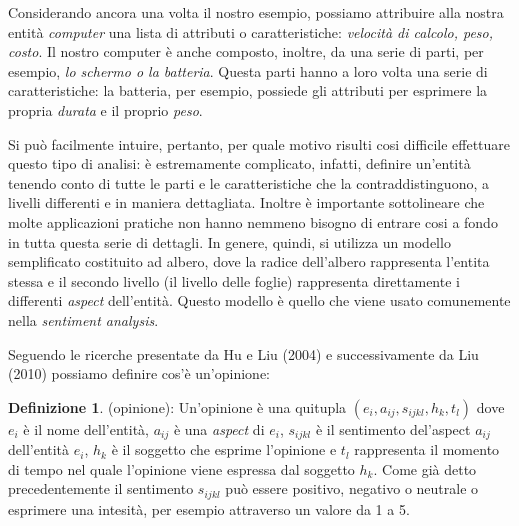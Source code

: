 \documentclass[a4paper,12pt,openright,twoside]{report}
\theoremstyle{definition}
\newtheorem{defi}{Definizione}[section]
\begin{document}
Considerando ancora una volta il nostro esempio, possiamo attribuire alla nostra entità \emph{computer}
una lista di attributi o caratteristiche: \emph{velocità di calcolo, peso, costo}. Il nostro computer è anche composto,
inoltre, da una serie di parti, per esempio, \emph{lo schermo o la batteria}. Questa parti hanno a loro volta
una serie di caratteristiche: la batteria, per esempio, possiede gli attributi per esprimere la 
propria \emph{durata} e il proprio \emph{peso}.

Si può facilmente intuire, pertanto, per quale motivo risulti cosi difficile effettuare questo tipo di analisi:
è estremamente complicato, infatti, definire un’entità tenendo conto di tutte le parti e le caratteristiche che la contraddistinguono, a livelli differenti e in  maniera dettagliata.
Inoltre è importante sottolineare che molte applicazioni pratiche non hanno nemmeno bisogno di entrare cosi
a fondo in tutta questa serie di dettagli.
In genere, quindi, si utilizza un modello semplificato costituito ad albero, dove la radice dell'albero 
rappresenta l'entita stessa
e il secondo livello (il livello delle foglie) rappresenta direttamente i differenti \emph{aspect} dell'entità.
Questo modello è quello che viene usato comunemente nella \emph{sentiment analysis}.

Seguendo le ricerche presentate da Hu e Liu (2004) e successivamente da Liu (2010) possiamo
definire cos'è un'opinione:

\begin{defi}(opinione): Un'opinione è una quitupla $(e_i, a_{ij}, s_{ijkl}, h_k, t_l)$ dove
	$e_i$ è il nome dell'entità, $a_{ij}$ è una \emph{aspect} di $e_i$, $s_{ijkl}$ è il
	sentimento del'aspect $a_{ij}$ dell'entità $e_i$, $h_k$ è il soggetto che esprime l'opinione e $t_l$
rappresenta il momento di tempo nel quale l'opinione viene espressa dal soggetto $h_k$.
Come già detto precedentemente il sentimento $s_{ijkl}$ può essere positivo, negativo o neutrale o esprimere una intesità,
per esempio attraverso un valore da 1 a 5.
\end{defi}
\end{document}
